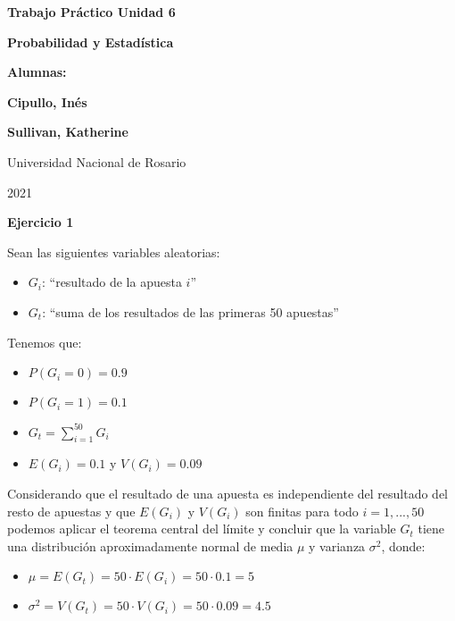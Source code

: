 \documentclass[11pt]{article}
\begin{document}
\begin{titlepage}
    \begin{center}
        \vfill
        \vfill
            \vspace{0.7cm}
            \noindent\textbf{\Huge Trabajo Pr\'actico Unidad 6}\par
            \noindent\textbf{\Huge Probabilidad y Estad\'istica}\par
            \vspace{.5cm}
        \vfill
        \noindent \textbf{\huge Alumnas:}\par
        \vspace{.5cm}
        \noindent \textbf{\Large Cipullo, In\'es}\par
        \noindent \textbf{\Large Sullivan, Katherine}\par
 
        \vfill
        \large Universidad Nacional de Rosario \par
        \noindent\large 2021
    \end{center}
\end{titlepage}
\par


\textbf{Ejercicio 1}

Sean las siguientes variables aleatorias:
\begin{itemize}
    \item $G_i$: ``resultado de la apuesta $i$''
    \item $G_t$: ``suma de los resultados de las primeras 50 apuestas''

\end{itemize}

Tenemos que:
\begin{itemize}
    \item $P(G_i = 0) = 0.9$
    \item $P(G_i = 1) = 0.1$
    \item $G_t = \sum_{i = 1}^{50} G_i$
    \item $E(G_i) = 0.1$ y $V(G_i) = 0.09$
\end{itemize}

Considerando que el resultado de una apuesta es independiente del resultado del resto de apuestas y que $E(G_i)$ y $V(G_i)$ son finitas 
para todo $i=1,...,50$ podemos aplicar el teorema central del l\'imite y concluir que la variable $G_t$ tiene una distribuci\'on 
aproximadamente normal de media $\mu$ y varianza $\sigma^2$, donde:

\begin{itemize}
    \item $\mu = E(G_t) = 50\cdot E(G_i) = 50\cdot 0.1 = 5$ 
    \item $\sigma^2 = V(G_t) = 50\cdot V(G_i) = 50\cdot 0.09 = 4.5$
\end{itemize}
\end{document}
